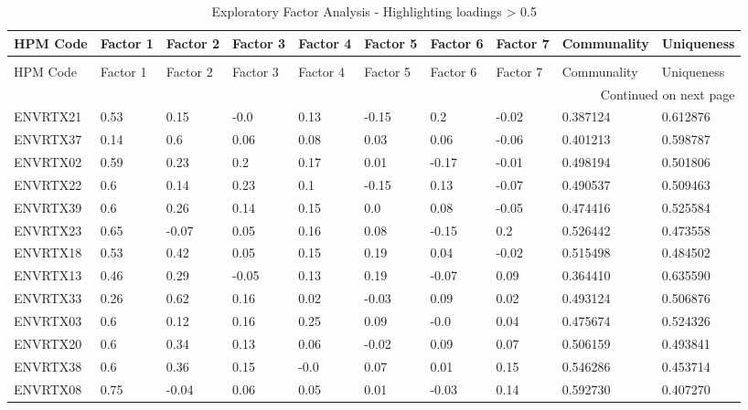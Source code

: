 \begin{landscape}
\small
\begin{longtable}{llllllllll}
\caption{Exploratory Factor Analysis - Highlighting loadings > 0.5} \label{tab:EFA} \\
\toprule
HPM Code & Factor 1 & Factor 2 & Factor 3 & Factor 4 & Factor 5 & Factor 6 & Factor 7 & Communality & Uniqueness \\
\midrule
\endfirsthead
\caption[]{Exploratory Factor Analysis - Highlighting loadings > 0.5} \\
\toprule
HPM Code & Factor 1 & Factor 2 & Factor 3 & Factor 4 & Factor 5 & Factor 6 & Factor 7 & Communality & Uniqueness \\
\midrule
\endhead
\midrule
\multicolumn{10}{r}{Continued on next page} \\
\midrule
\endfoot
\bottomrule
\endlastfoot
ENVRTX21 & \cellcolor{yellow}0.53 & 0.15 & -0.0 & 0.13 & -0.15 & 0.2 & -0.02 & 0.387124 & 0.612876 \\
ENVRTX37 & 0.14 & \cellcolor{yellow}0.6 & 0.06 & 0.08 & 0.03 & 0.06 & -0.06 & 0.401213 & 0.598787 \\
ENVRTX02 & \cellcolor{yellow}0.59 & 0.23 & 0.2 & 0.17 & 0.01 & -0.17 & -0.01 & 0.498194 & 0.501806 \\
ENVRTX22 & \cellcolor{yellow}0.6 & 0.14 & 0.23 & 0.1 & -0.15 & 0.13 & -0.07 & 0.490537 & 0.509463 \\
ENVRTX39 & \cellcolor{yellow}0.6 & 0.26 & 0.14 & 0.15 & 0.0 & 0.08 & -0.05 & 0.474416 & 0.525584 \\
ENVRTX23 & \cellcolor{yellow}0.65 & -0.07 & 0.05 & 0.16 & 0.08 & -0.15 & 0.2 & 0.526442 & 0.473558 \\
ENVRTX18 & \cellcolor{yellow}0.53 & 0.42 & 0.05 & 0.15 & 0.19 & 0.04 & -0.02 & 0.515498 & 0.484502 \\
ENVRTX13 & 0.46 & 0.29 & -0.05 & 0.13 & 0.19 & -0.07 & 0.09 & 0.364410 & 0.635590 \\
ENVRTX33 & 0.26 & \cellcolor{yellow}0.62 & 0.16 & 0.02 & -0.03 & 0.09 & 0.02 & 0.493124 & 0.506876 \\
ENVRTX03 & \cellcolor{yellow}0.6 & 0.12 & 0.16 & 0.25 & 0.09 & -0.0 & 0.04 & 0.475674 & 0.524326 \\
ENVRTX20 & \cellcolor{yellow}0.6 & 0.34 & 0.13 & 0.06 & -0.02 & 0.09 & 0.07 & 0.506159 & 0.493841 \\
ENVRTX38 & \cellcolor{yellow}0.6 & 0.36 & 0.15 & -0.0 & 0.07 & 0.01 & 0.15 & 0.546286 & 0.453714 \\
ENVRTX08 & \cellcolor{yellow}0.75 & -0.04 & 0.06 & 0.05 & 0.01 & -0.03 & 0.14 & 0.592730 & 0.407270 \\

\end{longtable}
\end{landscape}
